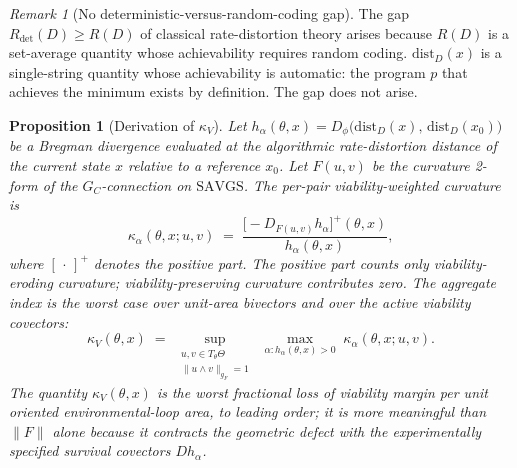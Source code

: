 \documentclass[11pt,a4paper]{article}
\theoremstyle{plain}
\newtheorem{proposition}[theorem]{Proposition}
\theoremstyle{definition}
\theoremstyle{remark}
\newtheorem{remark}[theorem]{Remark}
\newcommand{\kk}{\kappa_{\!V}}
\newcommand{\distD}{\mathrm{dist}_{D}}
\newcommand{\SAVGS}{\mathrm{SAVGS}}
\begin{document}
\begin{remark}[No deterministic-versus-random-coding gap]
The gap $R_{\mathrm{det}}(D)\geq R(D)$ of classical rate-distortion
theory arises because $R(D)$ is a set-average quantity whose
achievability requires random coding. $\distD(x)$ is a single-string
quantity whose achievability is automatic: the program $p$ that achieves
the minimum exists by definition. The gap does not arise.
\end{remark}

\begin{proposition}[Derivation of $\kk$]\label{prop:kappa-derivation}
Let $h_\alpha(\theta, x) = D_\phi\bigl(\distD(x),\,\distD(x_0)\bigr)$ be
a Bregman divergence evaluated at the algorithmic rate-distortion
distance of the current state $x$ relative to a reference $x_0$. Let
$F(u,v)$ be the curvature 2-form of the $G_C$-connection on
$\SAVGS$. The per-pair viability-weighted curvature is
\begin{equation}\label{eq:kappa-derivation}
  \kappa_\alpha(\theta, x; u, v) \;=\; \frac{\bigl[-D_{F(u,v)}h_\alpha\bigr]^+(\theta, x)}{h_\alpha(\theta, x)},
\end{equation}
where $[\,\cdot\,]^+$ denotes the positive part. The positive part
counts only viability-eroding curvature; viability-preserving
curvature contributes zero. The aggregate index is the worst case over
unit-area bivectors and over the active viability covectors:
\begin{equation}\label{eq:kappaV-aggregate}
  \kk(\theta, x) \;=\; \sup_{\substack{u, v \in T_\theta\Theta \\ \|u \wedge v\|_{g_F} = 1}}\;
  \max_{\alpha : h_\alpha(\theta, x) > 0}\;
  \kappa_\alpha(\theta, x; u, v).
\end{equation}
The quantity $\kk(\theta, x)$ is the worst fractional loss of
viability margin per unit oriented environmental-loop area, to leading
order; it is more meaningful than $\|F\|$ alone because it contracts
the geometric defect with the experimentally specified survival
covectors $D h_\alpha$.
\end{proposition}
\end{document}

